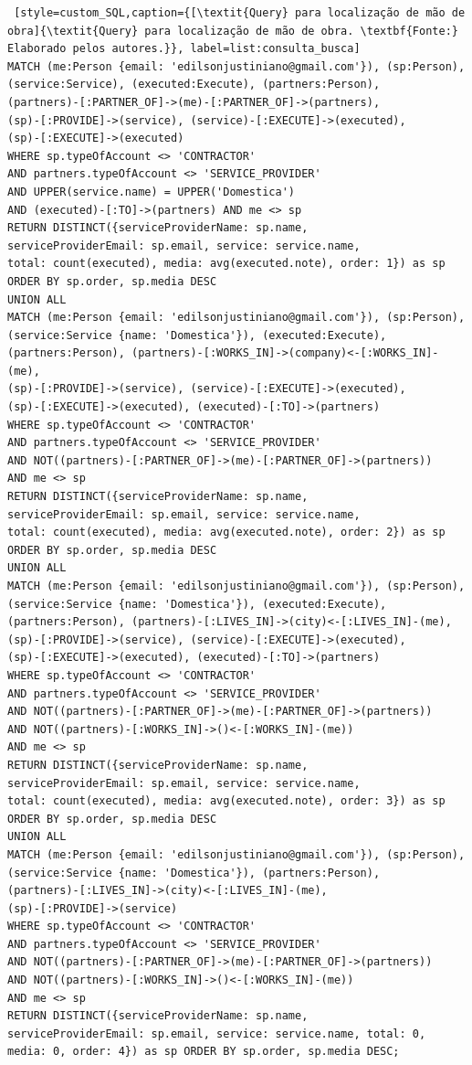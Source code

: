 \begin{lstlisting} [style=custom_SQL,caption={[\textit{Query} para localização de mão de obra]{\textit{Query} para localização de mão de obra. \textbf{Fonte:} Elaborado pelos autores.}}, label=list:consulta_busca] 	
MATCH (me:Person {email: 'edilsonjustiniano@gmail.com'}), (sp:Person), 
(service:Service), (executed:Execute), (partners:Person), 
(partners)-[:PARTNER_OF]->(me)-[:PARTNER_OF]->(partners),
(sp)-[:PROVIDE]->(service), (service)-[:EXECUTE]->(executed),
(sp)-[:EXECUTE]->(executed)
WHERE sp.typeOfAccount <> 'CONTRACTOR' 
AND partners.typeOfAccount <> 'SERVICE_PROVIDER'
AND UPPER(service.name) = UPPER('Domestica')
AND (executed)-[:TO]->(partners) AND me <> sp
RETURN DISTINCT({serviceProviderName: sp.name, 
serviceProviderEmail: sp.email, service: service.name,
total: count(executed), media: avg(executed.note), order: 1}) as sp 
ORDER BY sp.order, sp.media DESC
UNION ALL
MATCH (me:Person {email: 'edilsonjustiniano@gmail.com'}), (sp:Person),
(service:Service {name: 'Domestica'}), (executed:Execute),
(partners:Person), (partners)-[:WORKS_IN]->(company)<-[:WORKS_IN]-(me),
(sp)-[:PROVIDE]->(service), (service)-[:EXECUTE]->(executed), 
(sp)-[:EXECUTE]->(executed), (executed)-[:TO]->(partners)
WHERE sp.typeOfAccount <> 'CONTRACTOR' 
AND partners.typeOfAccount <> 'SERVICE_PROVIDER'
AND NOT((partners)-[:PARTNER_OF]->(me)-[:PARTNER_OF]->(partners))
AND me <> sp
RETURN DISTINCT({serviceProviderName: sp.name, 
serviceProviderEmail: sp.email, service: service.name, 
total: count(executed), media: avg(executed.note), order: 2}) as sp 
ORDER BY sp.order, sp.media DESC
UNION ALL
MATCH (me:Person {email: 'edilsonjustiniano@gmail.com'}), (sp:Person),
(service:Service {name: 'Domestica'}), (executed:Execute), 
(partners:Person), (partners)-[:LIVES_IN]->(city)<-[:LIVES_IN]-(me),
(sp)-[:PROVIDE]->(service), (service)-[:EXECUTE]->(executed), 
(sp)-[:EXECUTE]->(executed), (executed)-[:TO]->(partners)
WHERE sp.typeOfAccount <> 'CONTRACTOR' 
AND partners.typeOfAccount <> 'SERVICE_PROVIDER'
AND NOT((partners)-[:PARTNER_OF]->(me)-[:PARTNER_OF]->(partners))
AND NOT((partners)-[:WORKS_IN]->()<-[:WORKS_IN]-(me))
AND me <> sp
RETURN DISTINCT({serviceProviderName: sp.name, 
serviceProviderEmail: sp.email, service: service.name, 
total: count(executed), media: avg(executed.note), order: 3}) as sp 
ORDER BY sp.order, sp.media DESC 
UNION ALL
MATCH (me:Person {email: 'edilsonjustiniano@gmail.com'}), (sp:Person),
(service:Service {name: 'Domestica'}), (partners:Person),
(partners)-[:LIVES_IN]->(city)<-[:LIVES_IN]-(me), 
(sp)-[:PROVIDE]->(service)
WHERE sp.typeOfAccount <> 'CONTRACTOR' 
AND partners.typeOfAccount <> 'SERVICE_PROVIDER'
AND NOT((partners)-[:PARTNER_OF]->(me)-[:PARTNER_OF]->(partners))
AND NOT((partners)-[:WORKS_IN]->()<-[:WORKS_IN]-(me))
AND me <> sp
RETURN DISTINCT({serviceProviderName: sp.name, 
serviceProviderEmail: sp.email, service: service.name, total: 0,
media: 0, order: 4}) as sp ORDER BY sp.order, sp.media DESC;
\end{lstlisting}

